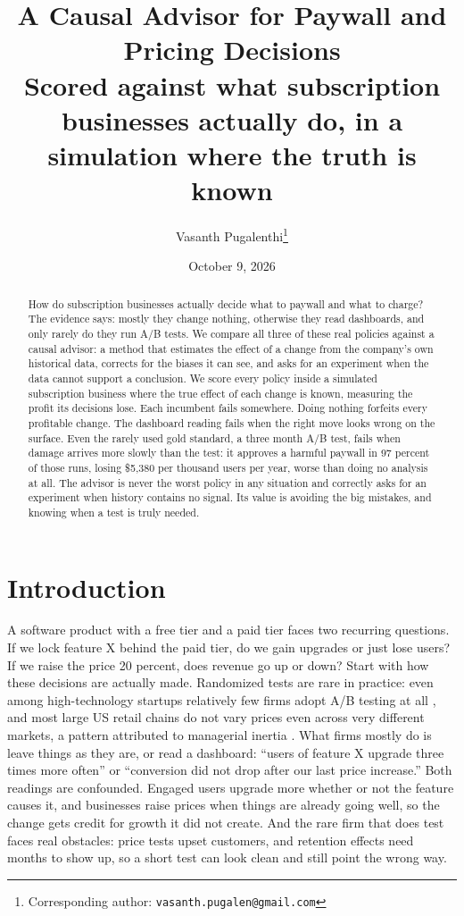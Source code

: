 \documentclass[10pt]{article}
\title{\sffamily\bfseries\boldmath\color{dmblue}
A Causal Advisor for Paywall and Pricing Decisions\\
\large\normalfont\sffamily\color{black}Scored against what subscription businesses actually do, in a simulation where the truth is known}
\author{Vasanth Pugalenthi\thanks{Corresponding author: \texttt{vasanth.pugalen@gmail.com}}}
\date{October 9, 2026}
\begin{document}
\maketitle
\thispagestyle{fancy}

\begin{abstract}
\noindent
How do subscription businesses actually decide what to paywall and what to
charge? The evidence says: mostly they change nothing, otherwise they read
dashboards, and only rarely do they run A/B tests. We compare all three of
these real policies against a causal advisor: a method that estimates the
effect of a change from the company's own historical data, corrects for the
biases it can see, and asks for an experiment when the data cannot support
a conclusion. We score every policy inside a simulated subscription
business where the true effect of each change is known, measuring the
profit its decisions lose. Each incumbent fails somewhere. Doing nothing
forfeits every profitable change. The dashboard reading fails when the
right move looks wrong on the surface. Even the rarely used gold standard,
a three month A/B test, fails when damage arrives more slowly than the
test: it approves a harmful paywall in 97 percent of those runs, losing
\$5{,}380 per thousand users per year, worse than doing no analysis at all.
The advisor is never the worst policy in any situation and correctly asks
for an experiment when history contains no signal. Its value is avoiding
the big mistakes, and knowing when a test is truly needed.
\end{abstract}

\section{Introduction}
A software product with a free tier and a paid tier faces two recurring
questions. If we lock feature X behind the paid tier, do we gain upgrades or
just lose users? If we raise the price 20 percent, does revenue go up or
down? Start with how these decisions are actually made. Randomized tests
are rare in practice: even among
high-technology startups relatively few firms adopt A/B testing at all
\citep{koning2022}, and most large US retail chains do not vary prices even
across very different markets, a pattern attributed to managerial inertia
\citep{dellavigna2019}. What firms mostly do is leave things as they are,
or read a dashboard: ``users of feature X upgrade three times more often''
or ``conversion did not drop after our last price increase.'' Both readings
are confounded. Engaged users upgrade more whether or not the feature
causes it, and businesses raise prices when things are already going well,
so the change gets credit for growth it did not create. And the rare firm
that does test faces real obstacles: price tests upset customers, and
retention effects need months to show up, so a short test can look clean
and still point the wrong way.
\end{document}
